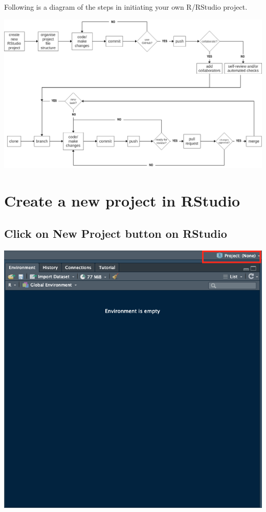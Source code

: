 \documentclass[
  12pt,
]{book}
\begin{document}
Following is a diagram of the steps in initiating your own R/RStudio project.

\includegraphics{images/git_process2.png}

\hypertarget{create-a-new-project-in-rstudio}{%
\section{Create a new project in RStudio}\label{create-a-new-project-in-rstudio}}

\hypertarget{click-on-new-project-button-on-rstudio}{%
\subsection{\texorpdfstring{Click on \textbf{New Project} button on RStudio}{Click on New Project button on RStudio}}\label{click-on-new-project-button-on-rstudio}}

\includegraphics{images/new_project1.png}
\end{document}
